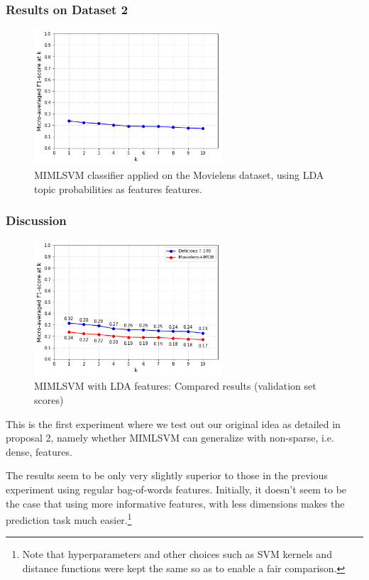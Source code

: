 \subsubsection{Results on Dataset 2}

\begin{figure}[H]
    \centering
    \includegraphics[width=7cm]{chapters/05_experiments/images/movielens-mimlsvm-lda.png}
    \caption{MIMLSVM classifier applied on the Movielens dataset, using LDA topic probabilities as features features.}
    \label{fig:movielens_mimlsvm_lda}
\end{figure}

\subsubsection{Discussion}

\begin{figure}[H]
    \centering
    \includegraphics[width=7cm]{chapters/05_experiments/images/proposal-2-compared-2.png}
    \caption{MIMLSVM with LDA features: Compared results (validation set scores)}
    \label{fig:compared_mimlsvm_lda}
\end{figure}

This is the first experiment where we test out our original idea as detailed in proposal 2, namely whether MIMLSVM can generalize with non-sparse, i.e. dense, features.

The results seem to be only very slightly superior to those in the previous experiment using regular bag-of-words features. Initially, it doesn't seem to be the case that using more informative features, with less dimensions makes the prediction task much easier.\footnote{Note that hyperparameters and other choices such as SVM kernels and distance functions were kept the same so as to enable a fair comparison.}


